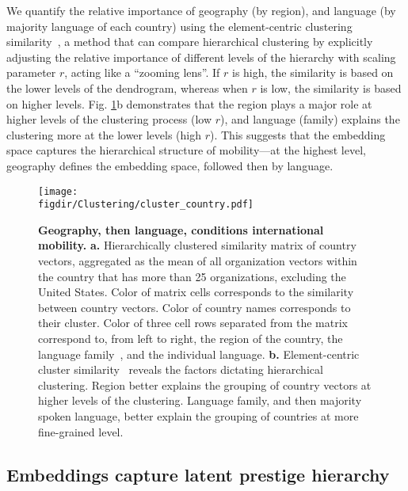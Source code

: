 \documentclass[12pt]{article} %
\def\figdir{../Figs}
\begin{document}
We quantify the relative importance of geography (by region), and language (by majority language of each country) using the element-centric clustering similarity~\autocite{gates2019element}, a method that can compare hierarchical clustering by explicitly adjusting the relative importance of different levels of the hierarchy with scaling parameter $r$, acting like a ``zooming lens''.
If $r$ is high, the similarity is based on the lower levels of the dendrogram, whereas when $r$ is low, the similarity is based on higher levels.
Fig. \ref{fig:clustering}b demonstrates that the region plays a major role at higher levels of the clustering process (low $r$), and language (family) explains the clustering more at the lower levels (high $r$).
This suggests that the embedding space captures the hierarchical structure of mobility---at the highest level, geography defines the embedding space, followed then by language.


%
%
\begin{figure}[p!]
	\centering
	\texttt{[image: \\figdir/Clustering/cluster\_country.pdf]}
	\caption{
		\textbf{Geography, then language, conditions international mobility.}
		\textbf{a.} Hierarchically clustered similarity matrix of country vectors, aggregated as the mean of all organization vectors within the country that has more than 25 organizations, excluding the United States.
		Color of matrix cells corresponds to the similarity between country vectors.
		Color of country names corresponds to their cluster.
		Color of three cell rows separated from the matrix correspond to, from left to right, the region of the country, the language family~\autocite{ethnologue}, and the individual language.
		\textbf{b.}	Element-centric cluster similarity~\autocite{gates2019element} reveals the factors dictating hierarchical clustering.
		Region better explains the grouping of country vectors at higher levels of the clustering.
		Language family, and then majority spoken language, better explain the grouping of countries at more fine-grained level.
	}
	\label{fig:clustering}
\end{figure}



%
%
\subsection*{Embeddings capture latent prestige hierarchy}
\end{document}
